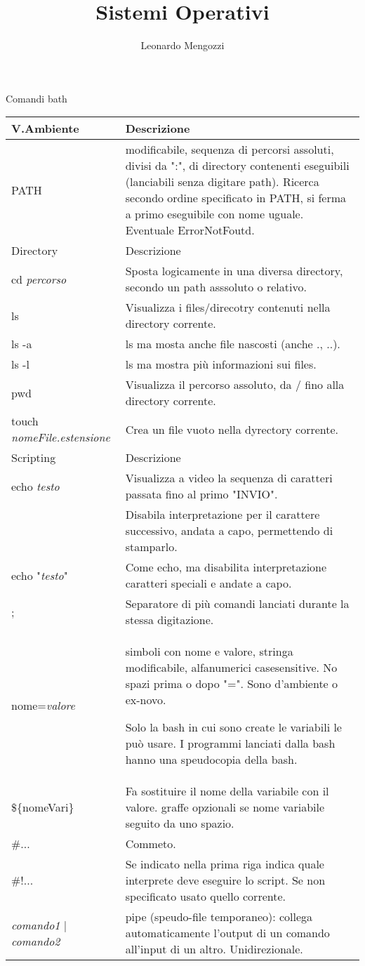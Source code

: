 \documentclass{article}
\title{Sistemi Operativi}
\author{Leonardo Mengozzi}
\date{}
\newcommand{\sezione}[1]{\hline#1 & Descrizione\\\hline}
\begin{document}
	\maketitle

	\centering
	{\large Comandi bath}\\[0.01\textheight]

	\begin{tabularx}{\textwidth}{lX}
	\sezione{V.Ambiente}
	PATH & modificabile, sequenza di percorsi assoluti, divisi da ":", di directory contenenti eseguibili (lanciabili senza digitare path). Ricerca secondo ordine specificato in PATH, si ferma a primo eseguibile con nome uguale. Eventuale ErrorNotFoutd.\\

	\sezione{Directory}
	cd \textit{percorso} & Sposta logicamente in una diversa directory, secondo un path asssoluto o relativo.\\
	ls & Visualizza i files/direcotry contenuti nella directory corrente.\\
	ls -a & ls ma mosta anche file nascosti (anche ., ..).\\
	ls -l & ls ma mostra più informazioni sui files.\\
	pwd & Visualizza il percorso assoluto, da / fino alla directory corrente.\\
	touch \textit{nomeFile.estensione} & Crea un file vuoto nella dyrectory corrente.\\

	\sezione{Scripting}
	echo \textit{testo} & Visualizza a video la sequenza di caratteri passata fino al primo "INVIO".\\
	\ & Disabila interpretazione per il carattere successivo, andata a capo, permettendo di stamparlo.\\
	echo "\textit{testo}" & Come echo, ma disabilita interpretazione caratteri speciali e andate a capo.\\
	; & Separatore di più comandi lanciati durante la stessa digitazione.\\
	nome=\textit{valore} & simboli con nome e valore, stringa modificabile, alfanumerici casesensitive. No spazi prima o dopo "=". Sono d'ambiente o ex-novo.

	Solo la bash in cui sono create le variabili le può usare. I programmi lanciati dalla bash hanno una speudocopia della bash.\\
	\$\{nomeVari\} & Fa sostituire il nome della variabile con il valore. graffe opzionali se nome variabile seguito da uno spazio.\\
	\#... & Commeto.\\
	\#!... & Se indicato nella prima riga indica quale interprete deve eseguire lo script. Se non specificato usato quello corrente.\\
	\textit{comando1} | \textit{comando2} & pipe (speudo-file temporaneo): collega automaticamente l'output di un comando all'input di un altro. Unidirezionale.\\


\end{tabularx}
\end{document}
